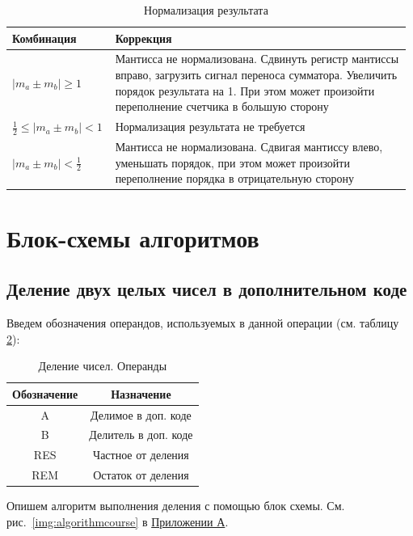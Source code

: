 \documentclass[a4paper,14pt]{extarticle}
\begin{document}
\begin{table}[h!]
	\small
	\begin{tabular}{|m{0.25\linewidth}|m{0.73\linewidth}|}
		\hline
		\textbf{Комбинация} &\textbf{Коррекция}\\
		\hline
		$\left|m_a\pm m_b\right|\ge1$ & Мантисса не нормализована. Сдвинуть регистр мантиссы вправо, загрузить сигнал переноса сумматора. Увеличить порядок результата на 1. При этом может произойти переполнение счетчика в большую сторону \\ 
		\hline
		$\frac12\le \left|m_a\pm m_b\right|< 1$ & Нормализация результата не требуется\\
		\hline
		$\left|m_a\pm m_b\right|<\frac12$ & Мантисса не нормализована. Сдвигая мантиссу влево, уменьшать порядок, при этом может произойти переполнение порядка в отрицательную сторону\\
		\hline
	\end{tabular}
	\caption{Нормализация результата}
	\label{tab:correction5}
\end{table}

\newpage

\section{Блок-схемы алгоритмов}
\subsection{Деление двух целых чисел в дополнительном коде}
Введем обозначения операндов, используемых в данной операции (см. таблицу \ref{tab:vars}):
\begin{table}[h!]
	\small
	\centering
	\begin{tabular}{|c|c|}
		\hline
		\multicolumn{1}{|c|}{\textbf{Обозначение}} & \multicolumn{1}{c|}{\textbf{Назначение}} \\ \hline
		A & Делимое в доп. коде \\ \hline
		B & Делитель в доп. коде \\ \hline
		RES & Частное от деления \\ \hline
		REM & Остаток от деления \\ \hline
	\end{tabular}
	\caption{Деление чисел. Операнды}
	\label{tab:vars}

\end{table} 

Опишем алгоритм выполнения деления  с помощью блок схемы.  См. рис.~\ref{img:algorithmcourse} в \hyperref[tam]{Приложении А}.
\end{document}
